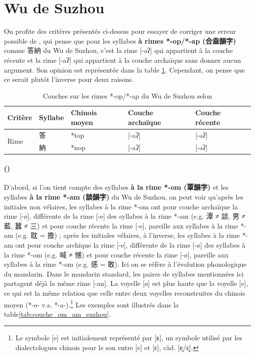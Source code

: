 \documentclass{scrbook}
\newcounter{c}[subsubsection]
\newcommand{\stpc}[1]{\stepcounter{#1}}
\newcommand{\illustre}{Les exemples sont illustrés dans la table\xspace}
\newcommand{\termyyx}[1]{\textbf{#1}}
\begin{document}
\begin{sloppypar}
\section{Wu de Suzhou}\label{couche_tantan_suzhou}
On profite des critères présentés ci-dessus pour essayer de corriger une erreur possible de \textcite[23]{Ye1988suzhou}, qui pense que pour les syllabes \termyyx{à rimes *-op/*-ap (合盍韻字)} comme 答納 du Wu de Suzhou, c'est la rime [-əʔ] qui appartient à la couche récente et la rime [-aʔ] qui appartient à la couche archaïque sans donner aucun argument. Son opinion est représentée dans la table \ref{tab:couche_op_ap_suzhou_ye}. Cependant, on pense que ce serait plutôt l'inverse pour deux raisons. 

\begin{table}[htbp]
  \centering
    \begin{tabular}{lllll}
    \toprule
    Critère & Syllabe & Chinois moyen  & Couche archaïque & Couche récente \\
    \midrule
    \multirow{2}[2]{*}{Rime} & 答     & *top  & [-aʔ] & [-əʔ] \\
          & 納     & *nop  & [-aʔ] & [-əʔ] \\
    \bottomrule
    \end{tabular}%
  \caption{Couches sur les rimes *-op/*-ap du Wu de Suzhou selon \textcite[23]{Ye1988suzhou}}
  \label{tab:couche_op_ap_suzhou_ye}%
\end{table}%

\stpc{c}\paragraph{()}
D'abord, si l'on tient compte des syllabes \termyyx{à la rime *-om (覃韻字)} et les syllabes \termyyx{à la rime *-am (談韻字)} du Wu de Suzhou, on peut voir qu'après les initiales non vélaires, les syllabes à la rime *-om ont pour couche archaïque la rime [-ø], différente de la rime [-e] des syllabes à la rime *-am (e.g. 潭 ≠ 談, 男 ≠ 藍, 蠶 ≠ 三) et pour couche récente la rime [-e], pareille aux syllabes à la rime *-am (e.g. 耽 = 擔) ; après les initiales vélaires, à l'inverse, les syllabes à la rime *-am ont pour couche archïque la rime [-e], différente de la rime [-ø] des syllabes à la rime *-om (e.g. 喊 ≠ 憾) et pour couche récente la rime [-ø], pareille aux syllabes à la rime *-om (e.g. 感 = 敢). Ici on se réfère à l'évolution phonologique du mandarin. Dans le mandarin standard, les paires de syllabes mentionnées ici partagent déjà la même rime [-an]. La voyelle [ø] est plus haute que la voyelle [e], ce qui est la même relation que celle entre deux voyelles reconstruites du chinois moyen (*-o- v.s. *-a-).\footnote{Le symbole [e] est initialement représenté par [ᴇ], un symbole utilisé par les dialectologues chinois pour le son entre [e] et [ɛ], càd. [e̞/ɛ̝].} \illustre \ref{tab:couche_om_am_suzhou}.


\end{sloppypar}
\end{document}
